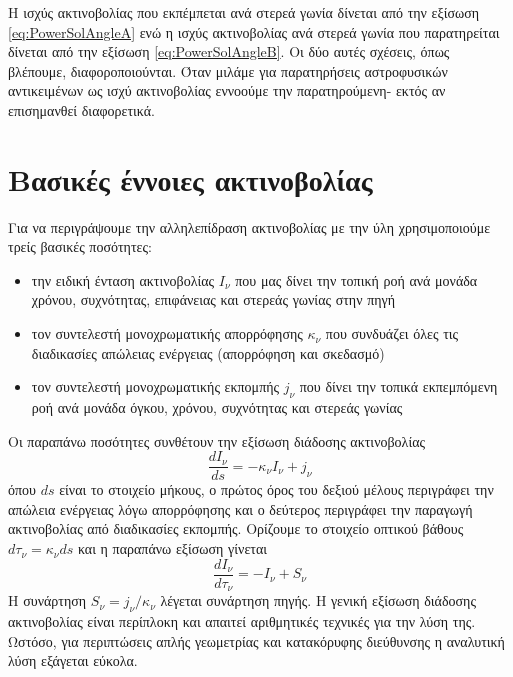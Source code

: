 Η ισχύς ακτινοβολίας που εκπέμπεται ανά στερεά γωνία δίνεται από την εξίσωση \ref{eq:PowerSolAngleA} ενώ η ισχύς ακτινοβολίας ανά στερεά γωνία που παρατηρείται δίνεται από την εξίσωση \ref{eq:PowerSolAngleB}\cite{1986rpa..book.....R}. Οι δύο αυτές σχέσεις, όπως βλέπουμε, διαφοροποιούνται. Όταν μιλάμε για παρατηρήσεις αστροφυσικών αντικειμένων ως ισχύ ακτινοβολίας εννοούμε την παρατηρούμενη- εκτός αν επισημανθεί διαφορετικά.

\section{Βασικές έννοιες ακτινοβολίας}
Για να περιγράψουμε την αλληλεπίδραση ακτινοβολίας με την ύλη χρησιμοποιούμε τρείς βασικές ποσότητες: 
\begin{itemize}
    \item την ειδική ένταση ακτινοβολίας $I_\nu$ που μας δίνει την τοπική ροή ανά μονάδα χρόνου, συχνότητας, επιφάνειας και στερεάς γωνίας στην πηγή 
    \item τον συντελεστή μονοχρωματικής απορρόφησης $\kappa_\nu$  που συνδυάζει όλες τις διαδικασίες απώλειας ενέργειας (απορρόφηση  και σκεδασμό)
    \item τον συντελεστή μονοχρωματικής εκπομπής $j_\nu$ που δίνει την τοπικά εκπεμπόμενη ροή ανά μονάδα όγκου, χρόνου, συχνότητας και στερεάς γωνίας
\end{itemize}      
Οι παραπάνω ποσότητες συνθέτουν την εξίσωση διάδοσης ακτινοβολίας 
\begin{equation}
    \frac{dI_\nu}{ds} = -\kappa_\nu I_\nu+j_\nu
\end{equation}
όπου $ds$ είναι το στοιχείο μήκους, ο πρώτος όρος του δεξιού μέλους περιγράφει την απώλεια ενέργειας λόγω απορρόφησης και ο δεύτερος περιγράφει την παραγωγή ακτινοβολίας από διαδικασίες εκπομπής\cite{netzer_2013}. Ορίζουμε το στοιχείο οπτικού βάθους $d \tau_\nu = \kappa_\nu ds$ και η παραπάνω εξίσωση γίνεται
\begin{equation}
    \frac{dI_\nu}{d\tau_\nu} = -I_\nu+S_\nu
\end{equation}
Η συνάρτηση $S_\nu =j_\nu/\kappa_\nu $ λέγεται συνάρτηση πηγής. Η γενική εξίσωση διάδοσης ακτινοβολίας είναι περίπλοκη και απαιτεί αριθμητικές τεχνικές για την λύση της. Ωστόσο, για περιπτώσεις απλής γεωμετρίας και κατακόρυφης διεύθυνσης η αναλυτική λύση εξάγεται εύκολα\cite{netzer_2013}.

